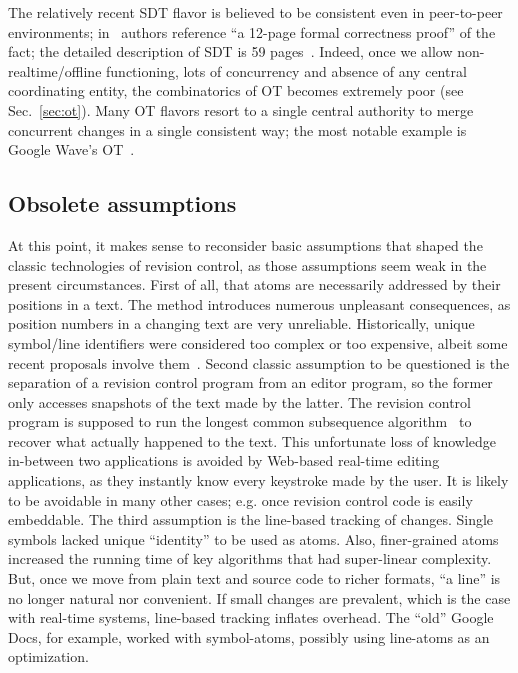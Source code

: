 \documentclass{sig-alternate}
\begin{document}
The relatively recent SDT flavor is believed to be consistent even in peer-to-peer environments; in~\cite{lili-preserving} authors reference ``a 12-page formal correctness proof'' of the fact; the detailed description of SDT is 59 pages~\cite{lili-ensuring}.
Indeed, once we allow non-realtime/offline functioning, lots of concurrency and absence of any central coordinating entity, the combinatorics of OT becomes extremely poor (see Sec.~\ref{sec:ot}).
Many OT flavors resort to a single central authority to merge concurrent changes in a single consistent way; the most notable example is Google Wave's OT~\cite{waveot}.

\subsection{Obsolete assumptions}
At this point, it makes sense to reconsider basic assumptions that shaped the classic technologies of revision control, as those assumptions seem weak in the present circumstances. 
First of all, that atoms are necessarily addressed by their positions in a text.
The method introduces numerous unpleasant consequences, as position numbers in a changing text are very unreliable. 
Historically, unique symbol/line identifiers were considered too complex or too expensive, albeit some recent proposals involve them~\cite{woot,logoot}.
Second classic assumption to be questioned is the separation of a revision control program from an editor program, so the former only accesses snapshots of the text made by the latter.
The revision control program is supposed to run the longest common subsequence algorithm~\cite{lcs-algo} to recover what actually happened to the text.
This unfortunate loss of knowledge in-between two applications is avoided by Web-based real-time editing applications, as they instantly know every keystroke made by the user.
It is likely to be avoidable in many other cases; e.g. once revision control code is easily embeddable.
The third assumption is the line-based tracking of changes. Single symbols lacked unique ``identity'' to be used as atoms. Also, finer-grained atoms increased the running time of key algorithms  that had super-linear complexity.
But, once we move from plain text and source code to richer formats, ``a line'' is no longer natural nor convenient.
If small changes are prevalent, which is the case with real-time systems, line-based tracking inflates overhead.
The ``old'' Google Docs, for example, worked with symbol-atoms, possibly using line-atoms as an optimization.
\end{document}
